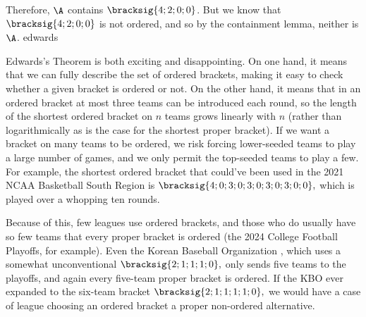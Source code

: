 {{        Therefore, $\A$ contains $\bracksig{4;2;0;0}$. But we know that $\bracksig{4;2;0;0}$ is not ordered, and so by the containment lemma, neither is $\A$.
    }{edwards}

    Edwards's Theorem is both exciting and disappointing. On one hand, it means that we can fully describe the set of ordered brackets, making it easy to check whether a given bracket is ordered or not. On the other hand, it means that in an ordered bracket at most three teams can be introduced each round, so the length of the shortest ordered bracket on $n$ teams grows linearly with $n$ (rather than logarithmically as is the case for the shortest proper bracket). If we want a bracket on many teams to be ordered, we risk forcing lower-seeded teams to play a large number of games, and we only permit the top-seeded teams to play a few. For example, the shortest ordered bracket that could've been used in the 2021 NCAA Basketball South Region is $\bracksig{4; 0; 3; 0; 3; 0; 3; 0; 3; 0; 0},$ which is played over a whopping ten rounds.


    Because of this, few leagues use ordered brackets, and those who do usually have so few teams that every proper bracket is ordered (the 2024 College Football Playoffs, for example). Even the Korean Baseball Organization \cite{wiki_kbo}, which uses a somewhat unconventional $\bracksig{2; 1; 1; 1; 0},$ only sends five teams to the playoffs, and again every five-team proper bracket is ordered. If the KBO ever expanded to the six-team bracket $\bracksig{2; 1; 1; 1; 1; 0},$ we would have a case of league choosing an ordered bracket a proper non-ordered alternative.
}